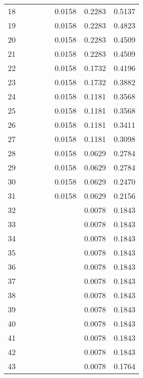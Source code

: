 \documentclass[12pt]{article}
\begin{document}
\begin{center}
\begin{longtable}{|c|c|c|c|c|c|c|c|}
                    18 &  &  &  &  & 0.0158 & 0.2283 & 0.5137 \\
                    19 &  &  &  &  & 0.0158 & 0.2283 & 0.4823 \\
                    20 &  &  &  &  & 0.0158 & 0.2283 & 0.4509 \\
                    21 &  &  &  &  & 0.0158 & 0.2283 & 0.4509 \\
                    22 &  &  &  &  & 0.0158 & 0.1732 & 0.4196 \\
                    23 &  &  &  &  & 0.0158 & 0.1732 & 0.3882 \\
                    24 &  &  &  &  & 0.0158 & 0.1181 & 0.3568 \\
                    25 &  &  &  &  & 0.0158 & 0.1181 & 0.3568 \\
                    26 &  &  &  &  & 0.0158 & 0.1181 & 0.3411 \\
                    27 &  &  &  &  & 0.0158 & 0.1181 & 0.3098 \\
                    28 &  &  &  &  & 0.0158 & 0.0629 & 0.2784 \\
                    29 &  &  &  &  & 0.0158 & 0.0629 & 0.2784 \\
                    30 &  &  &  &  & 0.0158 & 0.0629 & 0.2470 \\
                    31 &  &  &  &  & 0.0158 & 0.0629 & 0.2156 \\
                    32 &  &  &  &  &  & 0.0078 & 0.1843 \\
                    33 &  &  &  &  &  & 0.0078 & 0.1843 \\
                    34 &  &  &  &  &  & 0.0078 & 0.1843 \\
                    35 &  &  &  &  &  & 0.0078 & 0.1843 \\
                    36 &  &  &  &  &  & 0.0078 & 0.1843 \\
                    37 &  &  &  &  &  & 0.0078 & 0.1843 \\
                    38 &  &  &  &  &  & 0.0078 & 0.1843 \\
                    39 &  &  &  &  &  & 0.0078 & 0.1843 \\
                    40 &  &  &  &  &  & 0.0078 & 0.1843 \\
                    41 &  &  &  &  &  & 0.0078 & 0.1843 \\
                    42 &  &  &  &  &  & 0.0078 & 0.1843 \\
                    43 &  &  &  &  &  & 0.0078 & 0.1764 \\

\end{longtable}
\end{center}
\end{document}
